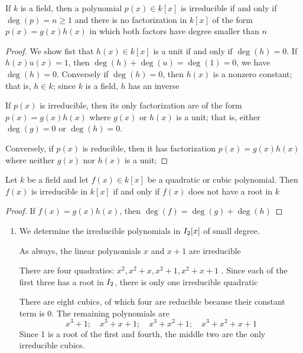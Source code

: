 \documentclass[11pt]{article}
\begin{document}
\begin{proposition}[]
If \(k\) is a field, then a polynomial \(p(x)\in k[x]\) is irreducible if and
only if \(\deg(p)=n\ge 1\) and there is no factorization in \(k[x]\) of the
form \(p(x)=g(x)h(x)\) in which both factors have degree smaller than \(n\)
\end{proposition}

\begin{proof}
We show fist that \(h(x)\in k[x]\) is a unit if and only if \(\deg(h)=0\). If
\(h(x)u(x)=1\), then \(\deg(h)+\deg(u)=\deg(1)=0\), we have \(\deg(h)=0\).
Conversely if \(\deg(h)=0\), then \(h(x)\) is a nonzero constant; that is, 
\(h\in k\); since \(k\) is a field, \(h\) has an inverse

If \(p(x)\) is irreducible, then its only factorization are of the form
\(p(x)=g(x)h(x)\) where \(g(x)\) or \(h(x)\) is a unit; that is, either \(\deg(g)=0\)
or \(\deg(h)=0\). 

Conversely, if \(p(x)\) is reducible, then it has factorization \(p(x)=g(x)h(x)\)
where neither \(g(x)\) nor \(h(x)\) is a unit;
\end{proof}

\begin{corollary}[]
\label{cor3.34}
Let \(k\) be a field and let \(f(x)\in k[x]\) be a quadratic or cubic polynomial.
Then \(f(x)\) is irreducible in \(k[x]\) if and only if \(f(x)\) does not have a root
in \(k\)
\end{corollary}

\begin{proof}
If \(f(x)=g(x)h(x)\), then \(\deg(f)=\deg(g)+\deg(h)\)
\end{proof}

\begin{examplle}[]
\label{example3.35}
\begin{enumerate}
\item We determine the irreducible polynomials in \(\relax{I}_2[x]\) of small degree.

As always, the linear polynomials \(x\) and \(x+1\) are irreducible

There are four quadratics: \(x^2,x^2+x,x^2+1,x^2+x+1\) . Since each of the
first three has a root in \(\relax{I}_2\), there is only one irreducible
quadratic

There are eight cubics, of which four are reducible because their constant
term is 0. The remaining polynomials are
\begin{equation*}
x^3+1;\quad x^3+x+1;\quad x^3+x^2+1;\quad x^3+x^2+x+1
\end{equation*}
Since 1 is a root of the first and fourth, the middle two are the only
irreducible cubics.
\end{enumerate}
\end{examplle}
\end{document}

